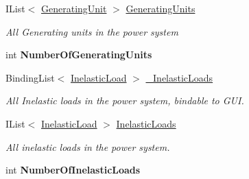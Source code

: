 \begin{DoxyCompactItemize}
I\+List$<$ \hyperlink{class_power_system_planning_1_1_generating_unit}{Generating\+Unit} $>$ \hyperlink{class_power_system_planning_1_1_power_system_aee8ba3b28d3f43e64484359f71cb35fd}{Generating\+Units}
\begin{DoxyCompactList}\small\item\em All Generating units in the power system \end{DoxyCompactList}\item 
int {\bfseries Number\+Of\+Generating\+Units}\hypertarget{class_power_system_planning_1_1_power_system_ab4f682e8428fe860d1541b3f81a4a5d4}{}\label{class_power_system_planning_1_1_power_system_ab4f682e8428fe860d1541b3f81a4a5d4}

\item 
Binding\+List$<$ \hyperlink{class_power_system_planning_1_1_inelastic_load}{Inelastic\+Load} $>$ \hyperlink{class_power_system_planning_1_1_power_system_a00de0d9b9439f8b3ec25b1ac020a503d}{\+\_\+\+Inelastic\+Loads}
\begin{DoxyCompactList}\small\item\em All Inelastic loads in the power system, bindable to G\+UI. \end{DoxyCompactList}\item 
I\+List$<$ \hyperlink{class_power_system_planning_1_1_inelastic_load}{Inelastic\+Load} $>$ \hyperlink{class_power_system_planning_1_1_power_system_a3785895f5e1d62105769d59f433979b1}{Inelastic\+Loads}
\begin{DoxyCompactList}\small\item\em All inelastic loads in the power system. \end{DoxyCompactList}\item 
int {\bfseries Number\+Of\+Inelastic\+Loads}\hypertarget{class_power_system_planning_1_1_power_system_a923796a156c2438a8a95bc34308732bc}{}\label{class_power_system_planning_1_1_power_system_a923796a156c2438a8a95bc34308732bc}


\end{DoxyCompactItemize}
